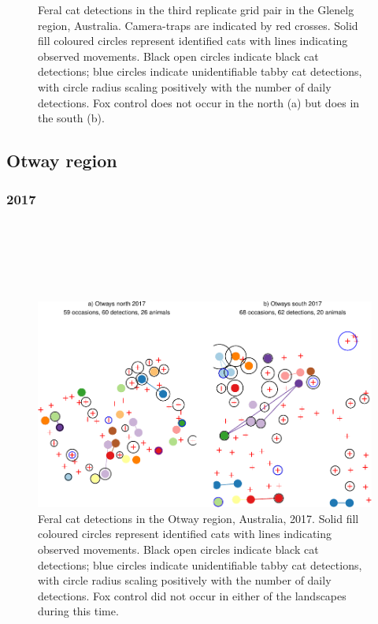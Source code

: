 \documentclass[11pt,a4paper,titlepage,twoside,openright]{style/unimelbthesis}
\begin{document}
\begin{mainmatter}
\begin{figure}
{}

\caption{Feral cat detections in the third replicate grid pair in the Glenelg region, Australia. Camera-traps are indicated by red crosses. Solid fill coloured circles represent identified cats with lines indicating observed movements. Black open circles indicate black cat detections; blue circles indicate unidentifiable tabby cat detections, with circle radius scaling positively with the number of daily detections. Fox control does not occur in the north (a) but does in the south (b).}\label{fig:density-plot-ch-3}
\end{figure}
\newpage

\hypertarget{otway-region}{%
\subsection{Otway region}\label{otway-region}}

\hypertarget{section}{%
\subsubsection{2017}\label{section}}

\(~\)

\(~\)

\(~\)
\begin{figure}

{\centering \includegraphics[width=1\linewidth]{figure/density-plot-ch-4-1} 

}

\caption{Feral cat detections in the Otway region, Australia, 2017. Solid fill coloured circles represent identified cats with lines indicating observed movements. Black open circles indicate black cat detections; blue circles indicate unidentifiable tabby cat detections, with circle radius scaling positively with the number of daily detections. Fox control did not occur in either of the landscapes during this time.}\label{fig:density-plot-ch-4}
\end{figure}
\newpage


\end{mainmatter}
\end{document}
